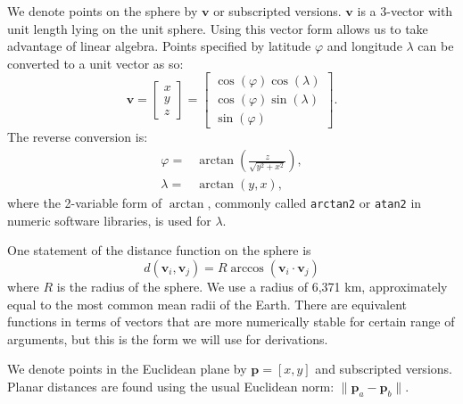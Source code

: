 \documentclass[]{interact}
\begin{document}
We denote points on the sphere by $\mathbf v$ or subscripted versions.
$\mathbf v$ is a 3-vector with unit length lying on the unit sphere.
Using this vector form allows us to take advantage of linear algebra.
Points specified by latitude $\varphi$ and longitude $\lambda$
can be converted to a unit vector as so:\citep{kent}
\begin{equation}
\mathbf v =
\begin{bmatrix*}
  x \\ y \\ z
\end{bmatrix*}
=
\begin{bmatrix*}
 \cos(\varphi) \cos(\lambda) \\
 \cos(\varphi) \sin(\lambda) \\
 \sin(\varphi)
\end{bmatrix*}.
\end{equation}
The reverse conversion is:
\begin{equation}\begin{split}
  \varphi =& \arctan\left(\frac{z}{\sqrt{y^2 + x^2}}\right), \\
  \lambda =& \arctan\left(y, x\right),
\end{split}\end{equation}
where the 2-variable form of $\arctan$, commonly called \texttt{arctan2} or
\texttt{atan2} in numeric software libraries, is used for $\lambda$.

One statement of the distance function on the sphere is
\begin{equation}
d\left(\mathbf v_i, \mathbf v_j\right)
= R \arccos\left(\mathbf v_i \cdot \mathbf v_j\right)
\end{equation}
where $R$ is the radius of the sphere. We use a radius of 6,371 km,
approximately equal to the most common mean radii of the Earth. \citep{snyder87}
There are equivalent functions in terms of vectors
that are more numerically stable for certain range of arguments,
but this is the form we will use for derivations.

We denote points in the Euclidean plane by $\mathbf p = [x, y]$ and
subscripted versions. Planar distances are found using the usual
Euclidean norm: $\|\mathbf p_a - \mathbf p_b\|$.
\end{document}
